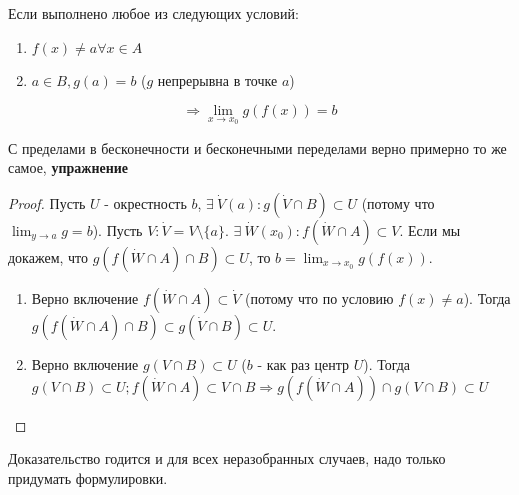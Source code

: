 \documentclass[12pt]{report}
\begin{document}
\begin{thm}
Если выполнено любое из следующих условий:
\begin{enumerate}
\item $f(x) \neq a \forall x \in A$
\item $a \in B, g(a) = b$ ($g$ непрерывна в точке $a$)
\end{enumerate}
$$\Rightarrow \lim_{x \to x_0}{g(f(x))} = b$$
\end{thm}
\begin{note}
С пределами в бесконечности и бесконечными переделами верно примерно то же самое, {\bfseries упражнение}
\end{note}
\begin{proof}
Пусть $U$ - окрестность $b$, $\exists ~\dot V(a): g(\dot V \cap B) \subset U$ (потому что $\lim_{y \to a}{g} = b$). Пусть $V: \dot V = V \setminus \{a\}$. $\exists ~\dot W(x_0): f(\dot W \cap A) \subset V$. Если мы докажем, что $g(f(\dot W \cap A) \cap B) \subset U$, то $b = \lim_{x \to x_0}{g(f(x))}$.
\begin{enumerate}
\item Верно включение $f(\dot W \cap A) \subset \dot V$ (потому что по условию $f(x) \neq a$). Тогда $g(f(\dot W \cap A) \cap B) \subset g(\dot V \cap B) \subset U$.
\item Верно включение $g(V \cap B) \subset U$ ($b$ - как раз центр $U$). Тогда $g(V \cap B) \subset U; f(\dot W \cap A) \subset V \cap B \Rightarrow g(f(\dot W \cap A)) \cap g(V \cap B) \subset U$
\end{enumerate}
\end{proof}
\begin{note}
Доказательство годится и для всех неразобранных случаев, надо только придумать формулировки.
\end{note}
\end{document}
